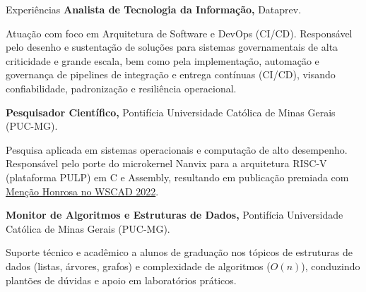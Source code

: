 \begin{rubric}{Experiências}
\entry*[2025 -- presente]%
    \textbf{Analista de Tecnologia da Informação,} Dataprev.
    \par Atuação com foco em Arquitetura de Software e DevOps (CI/CD). Responsável pelo desenho e sustentação de soluções para sistemas governamentais de alta criticidade e grande escala, bem como pela implementação, automação e governança de pipelines de integração e entrega contínuas (CI/CD), visando confiabilidade, padronização e resiliência operacional.

\entry*[2020 -- 2022]%
    \textbf{Pesquisador Científico,} Pontifícia Universidade Católica de Minas Gerais (PUC-MG).
    \par Pesquisa aplicada em sistemas operacionais e computação de alto desempenho. Responsável pelo porte do microkernel Nanvix para a arquitetura RISC-V (plataforma PULP) em C e Assembly, resultando em publicação premiada com \href{https://drive.google.com/file/d/1EJsnv8WvVObpRNreRR2fV2hepMs9ifsz/view?usp=sharing}{Menção Honrosa no WSCAD 2022}.

\entry*[2022]%
    \textbf{Monitor de Algoritmos e Estruturas de Dados,} Pontifícia Universidade Católica de Minas Gerais (PUC-MG).
    \par Suporte técnico e acadêmico a alunos de graduação nos tópicos de estruturas de dados (listas, árvores, grafos) e complexidade de algoritmos ($O(n)$), conduzindo plantões de dúvidas e apoio em laboratórios práticos.
\end{rubric}
